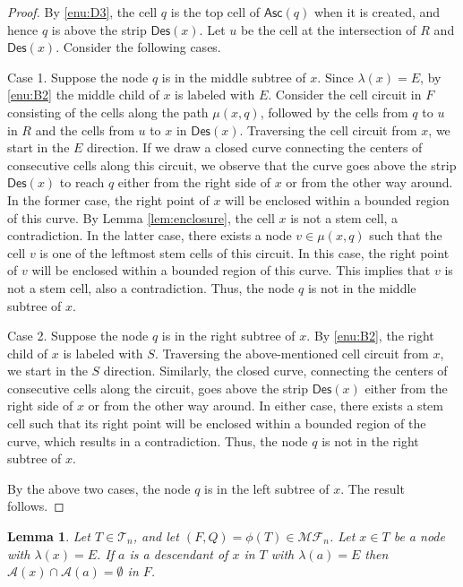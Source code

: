 \documentclass[a4paper,11pt,reqno]{amsart}
\newtheorem{lem}{Lemma}[section]
\theoremstyle{definition}
\numberwithin{equation}{section}
\newcommand{\A}{{\mathcal{A}}}
\newcommand{\Des}{{\textsf{Des}}}
\newcommand{\Asc}{{\textsf{Asc}}}
\newcommand{\MF}{{\mathcal{MF}}}
\newcommand{\T}{{\mathcal{T}}}
\begin{document}
\begin{proof}
By \ref{enu:D3}, the cell $q$ is the top cell of $\Asc(q)$ when it is created, and hence $q$ is above the strip $\Des(x)$. Let $u$ be the cell at the intersection of $R$ and $\Des(x)$. Consider the following cases.

Case 1. Suppose the node $q$ is in the middle subtree of $x$.   Since $\lambda(x)=E$, by \ref{enu:B2} the middle child of $x$ is labeled with $E$. Consider the cell circuit in $F$ consisting of the cells along the path $\mu(x,q)$, followed by the cells from $q$ to $u$ in $R$ and the cells from $u$ to $x$ in $\Des(x)$.
Traversing the cell circuit from $x$, we start in the $E$ direction. If we draw a closed curve connecting the centers of consecutive cells along this circuit, we observe that the curve goes above the strip $\Des(x)$ to reach $q$ either from the right side of $x$ or from the other way around. In the former case, the right point of $x$ will be enclosed within a bounded region of this curve. By Lemma \ref{lem:enclosure},  the cell $x$ is not a stem cell, a contradiction. In the latter case, there exists a node $v\in\mu(x,q)$ such that the cell $v$ is one of the leftmost stem cells of this circuit. In this case, the right point of $v$ will be enclosed within a bounded region of this curve. This implies that $v$ is not a stem cell, also a contradiction. Thus, the node $q$ is not in the middle subtree of $x$.

Case 2. Suppose the node $q$ is in the right subtree of $x$. By \ref{enu:B2}, the right child of $x$ is labeled with $S$. Traversing the above-mentioned cell circuit from $x$, we start in the $S$ direction. Similarly, the closed curve, connecting the centers of consecutive cells along the circuit, goes above the strip $\Des(x)$ either from the right side of $x$ or from the other way around. In either case, there exists a stem cell such that its right point will be enclosed within a bounded region of the curve, which results in a contradiction. Thus, the node $q$ is not in the right subtree of $x$. 

By the above two cases, the node $q$ is in the left subtree of $x$. The result follows.
\end{proof}





\begin{lem} \label{lem:disjoint}
Let $T\in\T_n$, and let $(F,Q)=\phi(T)\in\MF_n$.  Let $x\in T$ be a node with $\lambda(x)=E$. If $a$ is a descendant of $x$ in $T$ with $\lambda(a)=E$ then $\A(x)\cap\A(a)=\emptyset$ in $F$.
\end{lem}
\end{document}
